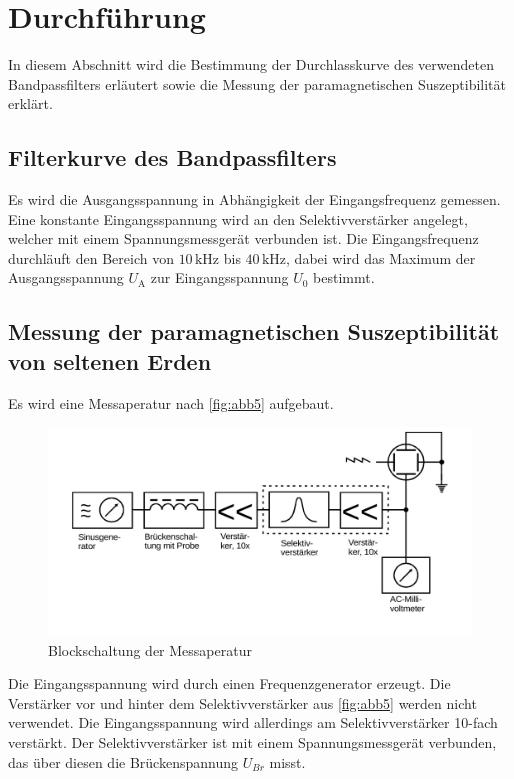 \section{Durchführung}
\label{sec:Durchführung}

In diesem Abschnitt wird die Bestimmung der Durchlasskurve des verwendeten Bandpassfilters erläutert sowie die Messung der paramagnetischen Suszeptibilität erklärt.

\subsection{Filterkurve des Bandpassfilters}

Es wird die Ausgangsspannung in Abhängigkeit der Eingangsfrequenz gemessen. 
Eine konstante Eingangsspannung wird an den Selektivverstärker angelegt, welcher mit einem Spannungsmessgerät verbunden ist. 
Die Eingangsfrequenz durchläuft den Bereich von $ 10 \, \unit{\kilo\hertz}$ bis $40 \, \unit{\kilo\hertz}$, dabei wird das Maximum der Ausgangsspannung $ U_\text{A} $ zur Eingangsspannung $U_0$ bestimmt.


\subsection{Messung der paramagnetischen Suszeptibilität von seltenen Erden}

Es wird eine Messaperatur nach \autoref{fig:abb5} aufgebaut.

\begin{figure}[H]
    \centering
    \includegraphics{figures/Abb_5.pdf}
    \caption{Blockschaltung der Messaperatur}
    \label{fig:abb5}
\end{figure} 

Die Eingangsspannung wird durch einen Frequenzgenerator erzeugt.
Die Verstärker vor und hinter dem Selektivverstärker aus \autoref{fig:abb5} werden nicht verwendet. 
Die Eingangsspannung wird allerdings am Selektivverstärker 10-fach verstärkt. 
Der Selektivverstärker ist mit einem Spannungsmessgerät verbunden, das über diesen die Brückenspannung $ U_{Br}$ misst.\\

